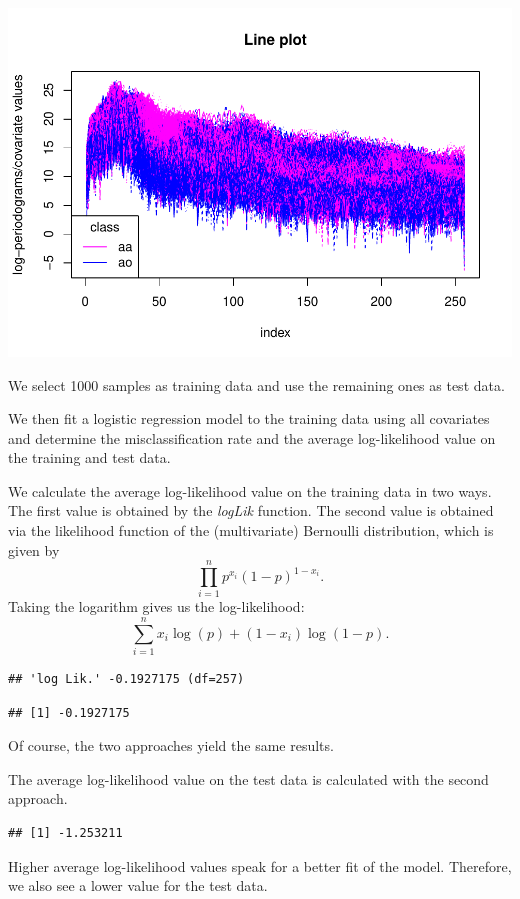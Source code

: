 \documentclass[
]{article}
\begin{document}
\includegraphics{A2_files/figure-latex/unnamed-chunk-20-1.pdf}

We select 1000 samples as training data and use the remaining ones as
test data.

We then fit a logistic regression model to the training data using all
covariates and determine the misclassification rate and the average
log-likelihood value on the training and test data.

We calculate the average log-likelihood value on the training data in
two ways. The first value is obtained by the \textit{logLik} function.
The second value is obtained via the likelihood function of the
(multivariate) Bernoulli distribution, which is given by
\[\prod_{i=1}^n p^{x_i}(1-p)^{1-x_i}.\] Taking the logarithm gives us
the log-likelihood: \[ \sum_{i=1}^n x_i \log(p)+(1-x_i)\log(1-p). \]

\begin{verbatim}
## 'log Lik.' -0.1927175 (df=257)
\end{verbatim}

\begin{verbatim}
## [1] -0.1927175
\end{verbatim}

Of course, the two approaches yield the same results.

The average log-likelihood value on the test data is calculated with the
second approach.

\begin{verbatim}
## [1] -1.253211
\end{verbatim}

Higher average log-likelihood values speak for a better fit of the
model. Therefore, we also see a lower value for the test data.
\end{document}
